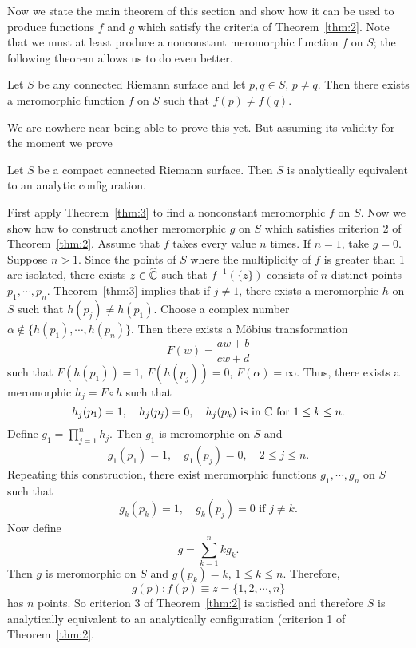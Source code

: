 \documentclass[a4paper,11pt]{article}
\begin{document}
Now we state the main theorem of this section and show how it can be
used to produce functions $f$ and $g$ which satisfy the criteria of
Theorem~\ref{thm:2}.  Note that we must at least produce a nonconstant
meromorphic function $f$ on $S$; the following theorem allows us to do
even better.

\begin{thm}
  \label{thm:3}
  Let $S$ be any connected Riemann surface and let $p,q \in S$, $p \ne
  q$.  Then there exists a meromorphic function $f$ on $S$ such that
  $f(p) \ne f(q)$.
\end{thm}

We are nowhere near being able to prove this yet.  But assuming its
validity for the moment we prove

\begin{cor}
  Let $S$ be a compact connected Riemann surface.  Then $S$ is
  analytically equivalent to an analytic configuration.
\end{cor}

\begin{myproof}
  First apply Theorem~\ref{thm:3} to find a nonconstant meromorphic
  $f$ on $S$.  Now we show how to construct another meromorphic $g$ on
  $S$ which satisfies criterion 2 of Theorem~\ref{thm:2}.  Assume that
  $f$ takes every value $n$ times.  
  If $n=1$, take $g=0$.  Suppose $n
  > 1$.  Since the points of $S$ where the multiplicity of $f$ is
  greater than 1 are isolated, there exists $z \in \widehat{{\mathbb C}}$
  such that $f^{-1}(\{z\})$ consists of $n$ distinct points $p_1,
  \cdots, p_n$.  Theorem~\ref{thm:3} implies that if $j\ne 1$, there
  exists a meromorphic $h$ on $S$ such that $h(p_j) \ne h(p_1)$.
  Choose a complex number $\alpha \notin \{h(p_1), \cdots, h(p_n)\}$.
  Then there exists a M\"obius transformation
  $$
  F(w) = \frac{aw+b}{cw+d}
  $$
  such that $F(h(p_1)) = 1$, $F(h(p_j)) = 0$, $F(\alpha) = \infty$.
  Thus, there exists a meromorphic $h_j = F\circ h$ such that
  $$
  h_j(p_1) = 1,\quad
  h_j(p_j) = 0,\quad
  h_j(p_k)\text{ is in }{\mathbb C}\text{ for }1\le k\le n.
  $$
  Define $g_1 = \prod_{j=1}^n h_j$.  Then $g_1$ is meromorphic on $S$
  and
  $$
  g_1(p_1) = 1,\quad
  g_1(p_j) = 0, \quad 2\le j\le n.
  $$
  Repeating this construction, there exist meromorphic functions $g_1,
  \cdots, g_n$ on $S$ such that
  $$
  g_k(p_k) = 1,\quad
  g_k(p_j) = 0 \text{ if } j\ne k.
  $$
  Now define
  $$
  g = \sum_{k=1}^{n} kg_k.
  $$
  Then $g$ is meromorphic on $S$ and $g(p_k) = k$, $1\le k \le n$.
  Therefore,
  $$
  g(p): f(p) \equiv z = \{1,2,\cdots, n\}
  $$
  has $n$ points.  So criterion 3 of Theorem~\ref{thm:2} is satisfied
  and therefore $S$ is analytically equivalent to an analytically
  configuration (criterion 1 of Theorem~\ref{thm:2}.
\end{myproof}
\end{document}
